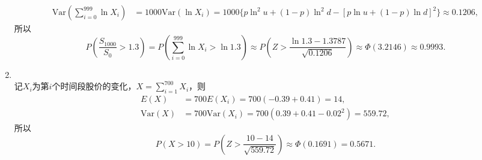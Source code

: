 \begin{enumerate}[label=\arabic{section}.\arabic*]
\begin{align*}
        \mathrm{Var}\left(\sum_{i=0}^{999} \ln X_i\right)&=1000\mathrm{Var}(\ln X_i)=1000\{p\ln^2 u+(1-p)\ln^2 d-[p\ln u+(1-p)\ln d]^2\} \approx 0.1206,
    \end{align*}
    所以
    \[P\left(\frac{S_{1000}}{S_0}>1.3\right)=P\left(\sum_{i=0}^{999} \ln X_i > \ln 1.3\right) \approx P\left(Z>\frac{\ln 1.3-1.3787}{\sqrt{0.1206}}\right) \approx \Phi(3.2146) \approx 0.9993.\]
    \item \sol\\
    记$X_i$为第$i$个时间段股价的变化，$\displaystyle X=\sum_{i=1}^{700} X_i$，则
    \begin{align*}
        E(X)&=700E(X_i)=700(-0.39+0.41) = 14,\\
        \mathrm{Var}(X)&=700\mathrm{Var}(X_i)=700(0.39+0.41-0.02^2) = 559.72,
    \end{align*}
    所以
    \[P(X>10)=P\left(Z>\frac{10-14}{\sqrt{559.72}}\right) \approx \Phi(0.1691)=0.5671.\]
\end{enumerate}
\clearpage